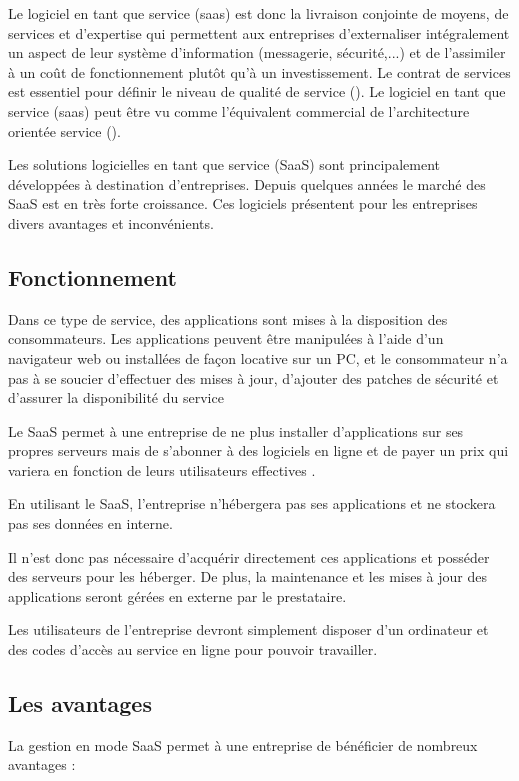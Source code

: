 Le logiciel en tant que service (\gls{saas}) est donc la livraison conjointe de moyens, de services et d'expertise qui permettent aux entreprises d'externaliser intégralement un aspect de leur système d'information (messagerie, sécurité,...) et de l'assimiler à un coût de fonctionnement plutôt qu'à un investissement. Le contrat de services est essentiel pour définir le niveau de qualité de service (). Le logiciel en tant que service (\gls{saas}) peut être vu comme l'équivalent commercial de l'architecture orientée service ().
\medskip

Les solutions logicielles en tant que service (SaaS) sont principalement développées à destination d'entreprises. Depuis quelques années le marché des SaaS est en très forte croissance. Ces logiciels présentent pour les entreprises divers avantages et inconvénients.

\subsection{Fonctionnement}
Dans ce type de service, des applications sont mises à la disposition des consommateurs. Les applications peuvent être manipulées à l'aide d'un navigateur web ou installées de façon locative sur un PC, et le consommateur n'a pas à se soucier d'effectuer des mises à jour, d'ajouter des patches de sécurité et d'assurer la disponibilité du service
\medskip

Le SaaS permet à une entreprise de ne plus installer d'applications sur ses propres serveurs mais de s'abonner à des logiciels en ligne et de payer un prix qui variera en fonction de leurs utilisateurs effectives \cite{modeSaaS}.
\medskip

En utilisant le SaaS, l'entreprise n'hébergera pas ses applications et ne stockera pas ses données en interne.
\medskip

Il n'est donc pas nécessaire d'acquérir directement ces applications et posséder des serveurs pour les héberger. De plus, la maintenance et les mises à jour des applications seront gérées en externe par le prestataire.
\medskip

Les utilisateurs de l'entreprise devront simplement disposer d'un ordinateur et des codes d'accès au service en ligne pour pouvoir travailler.

\subsection{Les avantages}
La gestion en mode SaaS permet à une entreprise de bénéficier de nombreux avantages :
\medskip

